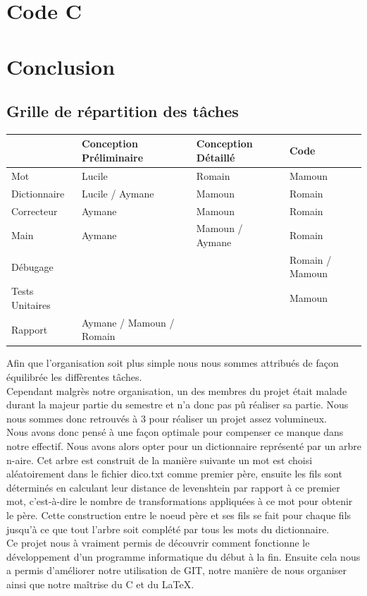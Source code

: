 \documentclass[11pt,a4paper]{article}
\begin{document}
        
    \section{Code C}
        
        \clearpage
        
    \section*{Conclusion}
        \subsection*{Grille de répartition des tâches}
        
         \begin{center}
            \begin{tabular}{ | l | l | l | l | } \hline
                & Conception Préliminaire & Conception Détaillé & Code \\ \hline
                Mot & Lucile & Romain  & Mamoun \\ \hline
                Dictionnaire & Lucile / Aymane & Mamoun & Romain \\ \hline
                Correcteur  & Aymane & Mamoun & Romain \\ \hline
                Main & Aymane & Mamoun / Aymane & Romain \\ \hline
                Débugage &  & & Romain / Mamoun\\ \hline
                Tests Unitaires & & & Mamoun  \\ \hline
                Rapport & Aymane / Mamoun / Romain & &\\ \hline
            \end{tabular}
        \end{center}
            Afin que l'organisation soit plus simple nous nous sommes attribués de façon équilibrée les diffèrentes tâches.\\
            Cependant malgrès notre organisation, un des membres du projet était malade durant la majeur partie du semestre et n'a donc pas pû réaliser sa partie. Nous nous sommes donc retrouvés à 3 pour réaliser un projet assez volumineux.\\
            Nous avons donc pensé à une façon optimale pour compenser ce manque dans notre effectif. Nous avons alors opter pour un dictionnaire représenté par un arbre n-aire. Cet arbre est construit de la manière suivante un mot est choisi aléatoirement dans le fichier dico.txt comme premier père, ensuite les fils sont déterminés en calculant leur distance de levenshtein par rapport à ce premier mot, c'est-à-dire le nombre de transformations appliquées à ce mot pour obtenir le père. Cette construction entre le noeud père et ses fils se fait pour chaque fils jusqu'à ce que tout l'arbre soit complété par tous les mots du dictionnaire.\\
            Ce projet nous à vraiment permis de découvrir comment fonctionne le développement d'un programme informatique du début à la fin. Ensuite cela nous a permis d'améliorer notre utilisation de GIT, notre manière de nous organiser ainsi que notre maîtrise du C et du \LaTeX. \\     
\end{document}
